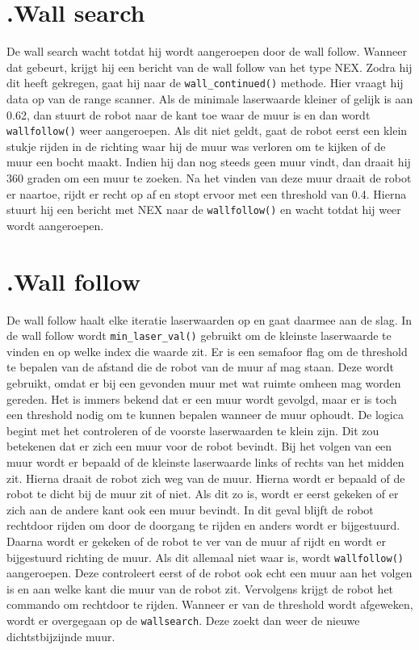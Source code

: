 \documentclass[a4paper,10pt]{article}
\begin{document}
\section*{\label{wallsearch}\thesection.\quad Wall search}
De wall search wacht totdat hij wordt aangeroepen door de wall follow. Wanneer dat gebeurt, krijgt hij een bericht van de wall follow van het type NEX. Zodra hij dit heeft gekregen, gaat hij naar de \verb!wall_continued()! methode. Hier vraagt hij data op van de range scanner. Als de minimale laserwaarde kleiner of gelijk is aan 0.62, dan stuurt de robot naar de kant toe waar de muur is en dan wordt \verb!wallfollow()! weer aangeroepen. Als dit niet geldt, gaat de robot eerst een klein stukje rijden in de richting waar hij de muur was verloren om te kijken of de muur een bocht maakt. Indien hij dan nog steeds geen muur vindt, dan draait hij 360 graden om een muur te zoeken. Na het vinden van deze muur draait de robot er naartoe, rijdt er recht op af en stopt ervoor met een threshold van 0.4. Hierna stuurt hij een bericht met NEX naar de \verb!wallfollow()! en wacht totdat hij weer wordt aangeroepen.

\section*{\label{wallfollow}\thesection.\quad Wall follow} De wall follow haalt elke iteratie laserwaarden op en gaat daarmee aan de slag. In de wall follow wordt \verb!min_laser_val()! gebruikt om de kleinste
laserwaarde te vinden en op welke index die waarde zit. Er is een semafoor flag om de threshold te bepalen van de afstand die de robot van de muur af mag staan. Deze wordt gebruikt, omdat er bij een gevonden muur met wat ruimte omheen mag worden gereden. Het is immers bekend dat er een muur wordt gevolgd, maar er is toch een threshold nodig om te kunnen bepalen wanneer de muur ophoudt. De logica begint met het controleren of de voorste laserwaarden te klein zijn. Dit zou betekenen dat er zich een muur voor de robot bevindt. Bij het volgen van een muur wordt er bepaald of de kleinste laserwaarde links of rechts van het midden zit. Hierna draait de robot zich weg van de muur. Hierna wordt er bepaald of de robot te dicht bij de muur zit of niet. Als dit zo is, wordt er eerst gekeken of er zich aan de andere kant ook een muur bevindt. In dit geval blijft de robot rechtdoor rijden om door de doorgang te rijden en anders wordt er bijgestuurd. Daarna wordt er gekeken of de robot te ver van de muur af rijdt en wordt er bijgestuurd richting de muur. Als dit allemaal niet waar is, wordt \verb!wallfollow()! aangeroepen. Deze controleert eerst of de robot ook echt een muur aan het volgen is en aan welke kant die muur van de robot zit. Vervolgens krijgt de robot het commando om rechtdoor te rijden. Wanneer er van de threshold wordt afgeweken, wordt er overgegaan op de \verb!wallsearch!. Deze zoekt dan weer de nieuwe dichtstbijzijnde muur. 
\end{document}
